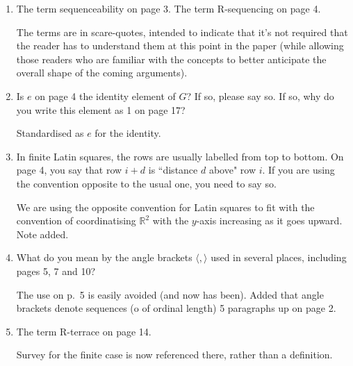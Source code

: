 \documentclass[12pt,a4paper]{article}
\newcommand{\R}{\mathbb{R}}
\newenvironment{QandA}{\begin{enumerate}[label=\bfseries\alph*.]\bfseries}
                      {\end{enumerate}}
\newenvironment{answered}{\par\normalfont}{}
\begin{document}
\begin{QandA}

\item
The term sequenceability on page 3.  The term R-sequencing on page 4.

\begin{answered}
The terms are in scare-quotes, intended to indicate that it's not required that the reader has to understand them at this point in the paper (while allowing those readers who are familiar with the concepts to better anticipate the overall shape of the coming arguments).
\end{answered}


\item 
Is $e$ on page 4 the identity element of $G$? If so, please say so. If so, why do you write this element as 1 on page 17?

\begin{answered}
Standardised as $e$ for the identity.
\end{answered}

\item
In finite Latin squares, the rows are usually labelled from top to bottom. On page 4, you say that row $i + d$ is ``distance $d$ above" row $i$. If you are using the convention opposite to the usual one, you need to say so.

\begin{answered}
We are using the opposite convention for Latin squares to fit with the convention of coordinatising $\R^2$ with the $y$-axis increasing as it goes upward.  Note added.
\end{answered}

\item
What do you mean by the angle brackets $\langle, \rangle$ used in several places, including pages 5, 7 and 10?

\begin{answered}
The use on p.~5 is easily avoided (and now has been).  Added that angle brackets denote sequences (o of ordinal length) 5 paragraphs up on page 2.

\end{answered}

\item
The term R-terrace on page 14.

\begin{answered}
Survey for the finite case is now referenced there, 
rather than a definition.
\end{answered}

\end{QandA}
\end{document}
